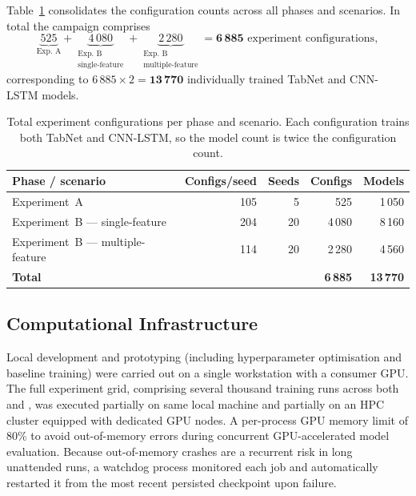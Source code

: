 \documentclass[../main.tex]{subfiles}
\begin{document}
Table~\ref{tab:grid-totals} consolidates the configuration counts across all phases and scenarios.  In total the campaign comprises
\[
    \underbrace{525}_{\text{Exp.~A}} + \underbrace{4\,080}_{\substack{\text{Exp.~B}\\\text{single-feature}}} + \underbrace{2\,280}_{\substack{\text{Exp.~B}\\\text{multiple-feature}}} = \mathbf{6\,885} \text{ experiment configurations},
\]
corresponding to $6\,885 \times 2 = \mathbf{13\,770}$ individually trained TabNet and CNN-LSTM models.

\begin{table}[H]
\centering
\caption{Total experiment configurations per phase and scenario. Each configuration trains both TabNet and CNN-LSTM, so the model count is twice the configuration count.}
\label{tab:grid-totals}
\small
\begin{tabular}{lrrrr}
\toprule
\textbf{Phase / scenario}              & \textbf{Configs/seed} & \textbf{Seeds} & \textbf{Configs} & \textbf{Models} \\
\midrule
Experiment~A                          & 105 & 5  & 525    & 1\,050 \\
Experiment~B — single-feature         & 204 & 20 & 4\,080 & 8\,160 \\
Experiment~B — multiple-feature       & 114 & 20 & 2\,280 & 4\,560 \\
\midrule
\textbf{Total}                        &     &    & \textbf{6\,885} & \textbf{13\,770} \\
\bottomrule
\end{tabular}
\end{table}





\subsection{Computational Infrastructure}
\label{sec:infra}

Local development and prototyping (including hyperparameter optimisation and baseline training) were carried out on a single workstation with a consumer GPU.  The full experiment grid, comprising several thousand training runs across both  and , was executed partially on same local machine and partially on an HPC cluster equipped with dedicated GPU nodes. A per-process GPU memory limit of 80\% to avoid out-of-memory errors during concurrent GPU-accelerated model evaluation.  Because out-of-memory crashes are a recurrent risk in long unattended runs, a watchdog process monitored each job and automatically restarted it from the most recent persisted checkpoint upon failure. 
\end{document}
